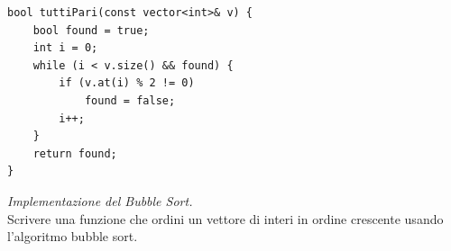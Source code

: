 \begin{soluzione}
\begin{codeexample}
  \begin{codebox}
    \begin{lstlisting}
bool tuttiPari(const vector<int>& v) {
    bool found = true;
    int i = 0;
    while (i < v.size() && found) {
        if (v.at(i) % 2 != 0)
            found = false;
        i++;
    }
    return found;
}
    \end{lstlisting}
  \end{codebox}
\end{codeexample}
\end{soluzione}


















\begin{problema}
\textit{Implementazione del Bubble Sort.}\\
Scrivere una funzione che ordini un vettore di interi in ordine crescente usando l'algoritmo bubble sort.
\end{problema}


